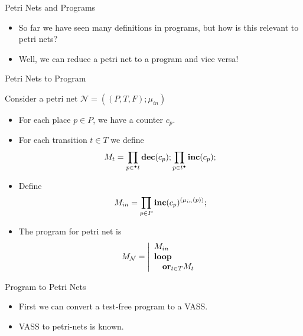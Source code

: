 \documentclass{beamer}
\newcommand{\inc}[0]{\text{\rmfamily{\textbf{inc}}}}
\newcommand{\dec}[0]{\text{\rmfamily{\textbf{dec}}}}
\newcommand{\lo}[0]{\text{\rmfamily{\textbf{loop}}}}
\newcommand{\Or}[0]{\text{\rmfamily{\textbf{or}}}}
\begin{document}
\begin{frame}{Petri Nets and Programs}

    \begin{itemize}
        \item So far we have seen many definitions in programs, but how is this relevant to petri nets?

        \item Well, we can reduce a petri net to a program and vice versa!
    \end{itemize}
    
\end{frame}

\begin{frame}{Petri Nets to Program}

Consider a petri net $\mathcal{N} = ((P,T,F);\mu_{in})$

    \begin{itemize}
        \item For each place $p \in P$, we have a counter $c_p$. 
        \item For each transition $t \in T$ we define 
        $$M_t = \prod_{p \in {}^{\bullet} t} \dec(c_p); \prod_{p \in t^{\bullet}} \inc(c_p);$$
        \item Define 
        $$M_{in} = \prod_{p \in P}\inc(c_p)^{(\mu_{in}(p))};$$
        \item The program for petri net is 
        $$M_{\mathcal{N}} = \left\vert \begin{array}{l}
            M_{in} \\
            \lo \\
            \quad \Or _ {t \in T} M_{t} \\
    \end{array} \right.$$
    \end{itemize}
\end{frame}

\begin{frame}{Program to Petri Nets}
    \begin{itemize}
        \item First we can convert a test-free program  to a VASS.
        \item VASS to petri-nets is known.
    \end{itemize}

\end{frame}
\end{document}
